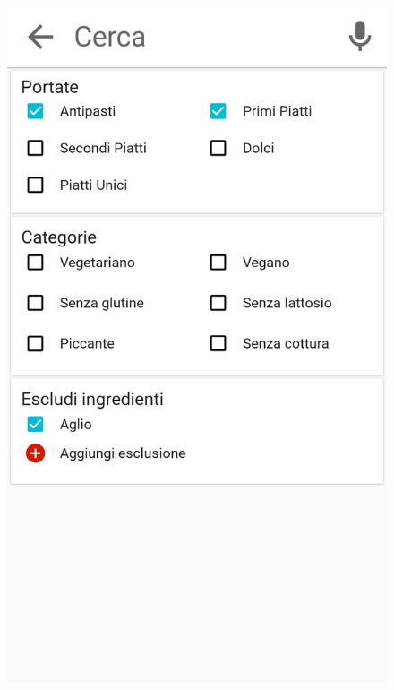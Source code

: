 \begin{figure}[H]
	
	\begin{minipage}{.49\textwidth}
		\includegraphics[width=\textwidth]{img/wireframe/search_page.png}
	\end{minipage}
	\begin{minipage}{.49\textwidth}

\end{minipage}
\end{figure}
